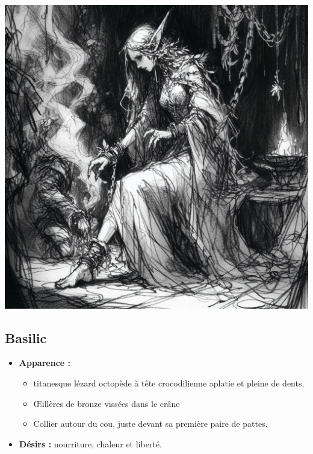 \vfill\
\begin{center}
  \vspace*{0.2\textheight}
  \includegraphics[width=\linewidth]{pics/succube.jpg}
\end{center}
\vfill

\pagebreak
\subsection{Basilic}\label{monster:n3:basilic}
\begin{itemize}
  \item \textbf{Apparence :}
  \begin{itemize}
    \item titanesque lézard octopède à tête crocodilienne aplatie et pleine de dents.
    \item \OE illères de bronze vissées dans le crâne
    \item Collier autour du cou, juste devant sa première paire de pattes.
  \end{itemize}
  \item \textbf{ Désirs :} nourriture, chaleur et liberté.
\end{itemize}

